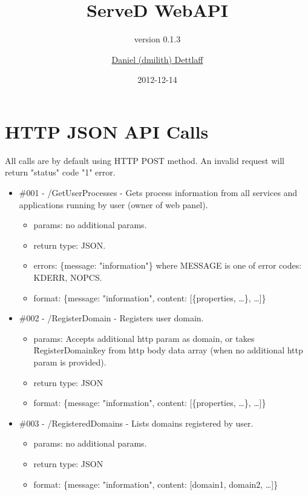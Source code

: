\documentclass[11pt,a4paper]{scrartcl}
\title{ServeD WebAPI}
\subtitle{version 0.1.3}
\author{\href{mailto:dmilith@verknowsys.com}{Daniel (dmilith) Dettlaff}}
\date{2012-12-14}
\begin{document}
\maketitle

\section{HTTP JSON API Calls}\label{sec:apicalls}
  All calls are by default using HTTP POST method.
  An invalid request will return "status" code "1" error.

  \begin{itemize}

    \item \#001 - /GetUserProcesses - Gets process information from all services and applications running by user (owner of web panel).
      \begin{itemize}
        \item params: no additional params.
        \item return type: JSON.
        \item errors: \{message: "information"\} where MESSAGE is one of error codes: KDERR, NOPCS.
        \item format: \{message: "information", content: [\{properties, …\}, …]\}
      \end{itemize}

    \item \#002 - /RegisterDomain - Registers user domain.
      \begin{itemize}
        \item params: Accepts additional http param as domain, or takes \"RegisterDomain\" key from http body data array (when no additional http param is provided).
        \item return type: JSON
        \item format: \{message: "information", content: [\{properties, …\}, …]\}
      \end{itemize}

    \item \#003 - /RegisteredDomains - Lists domains registered by user.
      \begin{itemize}
        \item params: no additional params.
        \item return type: JSON
        \item format: \{message: "information", content: [domain1, domain2, …]\}
      \end{itemize}

  \end{itemize}
\end{document}
